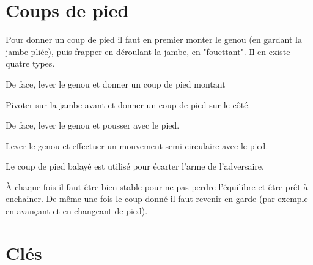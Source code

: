 \section{Coups de pied}


Pour donner un coup de pied il faut en premier monter le genou (en gardant la jambe pliée), puis frapper en déroulant la jambe, en "fouettant".
Il en existe quatre types.


\begin{coup}

De face, lever le genou et donner un coup de pied montant
\end{coup}


\begin{coup}

Pivoter sur la jambe avant et donner un coup de pied sur le côté.
\end{coup}


\begin{coup}

De face, lever le genou et pousser avec le pied.
\end{coup}


\begin{coup}

Lever le genou et effectuer un mouvement semi-circulaire avec le pied.
\end{coup}


Le coup de pied balayé est utilisé pour écarter l'arme de l'adversaire.

À chaque fois il faut être bien stable pour ne pas perdre l'équilibre et être prêt à enchainer. De même une fois le coup donné il faut revenir en garde (par exemple en avançant et en changeant de pied).


\section{Clés}


